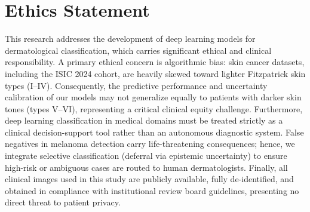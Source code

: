 \documentclass[letterpaper]{article} %
\begin{document}
\section{Ethics Statement}
This research addresses the development of deep learning models for dermatological classification, which carries significant ethical and clinical responsibility. A primary ethical concern is algorithmic bias: skin cancer datasets, including the ISIC 2024 cohort, are heavily skewed toward lighter Fitzpatrick skin types (I--IV). Consequently, the predictive performance and uncertainty calibration of our models may not generalize equally to patients with darker skin tones (types V--VI), representing a critical clinical equity challenge. Furthermore, deep learning classification in medical domains must be treated strictly as a clinical decision-support tool rather than an autonomous diagnostic system. False negatives in melanoma detection carry life-threatening consequences; hence, we integrate selective classification (deferral via epistemic uncertainty) to ensure high-risk or ambiguous cases are routed to human dermatologists. Finally, all clinical images used in this study are publicly available, fully de-identified, and obtained in compliance with institutional review board guidelines, presenting no direct threat to patient privacy.

\end{document}
